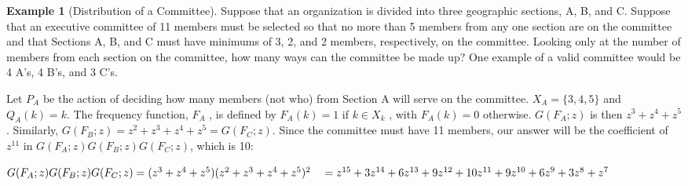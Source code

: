 \documentclass[10pt,]{book}
\theoremstyle{plain}
\theoremstyle{definition}
\theoremstyle{definition}
\theoremstyle{definition}
\newtheorem{example}[theorem]{Example}
\theoremstyle{definition}
\numberwithin{equation}{section}
\begin{document}
\begin{example}[Distribution of a Committee]\label{ex-committee-distribution}
Suppose that an organization is divided into three geographic sections, A, B, and C. Suppose that an executive committee of
11 members must be selected so that no more than 5 members from any one section are on the committee and that Sections A, B, and C must have minimums
of 3, 2, and 2 members, respectively, on the committee. Looking only at the number of members from each section on the committee, how many ways can
the committee be made up? One example of a valid committee would be 4 A's, 4 B's, and 3 C's.



Let \(P_A\) be the action of deciding how many members (not who) from Section A will serve on the committee. \(X_A= \{3, 4, 5\}\) and \(Q_A(k)=k\).
{ }The frequency function, \(F_A\) , is defined by \(F_A(k)=1\) if \(k\in X_k\) , with \(F_A(k)=0\) otherwise. \(G(F_A;z)\) is then \(z^3+
z^4+z^5\) . Similarly, \(G(F_B;z) =z^2+ z^3+ z ^4 + z^5= G(F_C ;z)\). Since the committee must have 11 members, our answer
will be the coefficient of \(z^{11}\) in \(G(F_A;z)G(F_B;z)G(F_C;z)\), which is 10:



\(G(F_A;z)G(F_B;z)G(F_C;z)=(z^3+ z^4+z^5)(z^2+ z^3+ z ^4 + z^5)^2\\
\\
\quad =z^{15}+3 z^{14}+6 z^{13}+9 z^{12}+10 z^{11}+9 z^{10}+6 z^9+3 z^8+z^7\)%
\end{example}
\typeout{************************************************}
\typeout{************************************************}
\end{document}
